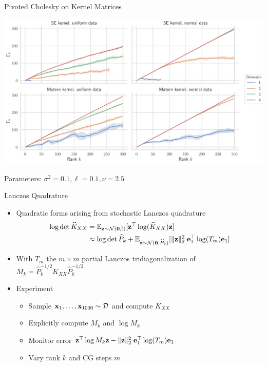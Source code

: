 \documentclass{beamer}
\begin{document}
\begin{frame}{Pivoted Cholesky on Kernel Matrices}
\begin{center}
    \includegraphics[width=\textwidth]{report/res/pivchol_gamma.pdf}
\end{center}
{\tiny Parameters: $\sigma^2 = 0.1, \ell = 0.1, \nu = 2.5$}
\end{frame}

\begin{frame}{Lanczos Quadrature}
\begin{itemize}[<+->]
    \item Quadratic forms arising from stochastic Lanczos quadrature \begin{align*}
        \log\det \widehat K_{XX} 
        &= \E_{\vect z \sim \mathcal N(\vect 0, \Id)}[\vect z^\top \log(\widehat K_{XX}) \vect z] \\
        &\approx \log\det \widehat P_k + \E_{\vect z \sim \mathcal N(\vect 0, \widehat P_k)}[\norm{\vect z}_2^2 \; \vect e_1^\top \log(T_m) \vect e_1]
    \end{align*}
    \item With $T_m$ the $m\times m$ partial Lanczos tridiagonalization of $M_k = \widehat P^{-1/2}_k \widehat K_{XX} \widehat P^{-1/2}_k$ 
    \item Experiment
    \begin{itemize}
        \item Sample $\boldsymbol{\mathbf{x}}_1, \ldots, \boldsymbol{\mathbf{x}}_{1000} \sim \mathcal D$ and compute $K_{XX}$
        \item Explicitly compute $M_k$ and $\log M_k$
        \item Monitor error $\boldsymbol{\mathbf{z}}^\top \log M_k \boldsymbol{\mathbf{z}} - \Vert \boldsymbol{\mathbf{z}} \Vert_2^2 \; \boldsymbol{\mathbf{e}}_1^\top \log(T_m) \boldsymbol{\mathbf{e}}_1$
        \item Vary rank $k$ and CG steps $m$
    \end{itemize}
\end{itemize}
\end{frame}
\end{document}
